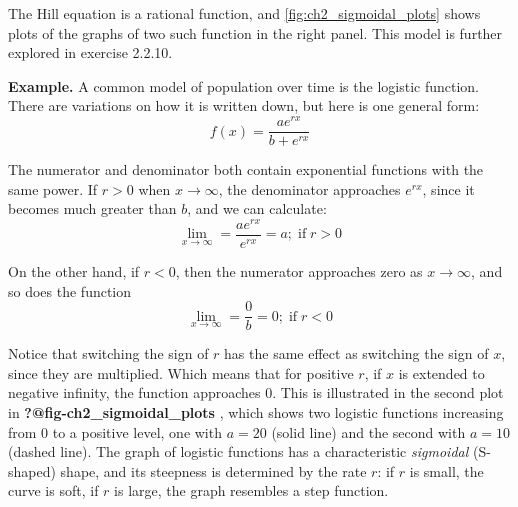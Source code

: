 \documentclass[
  letterpaper,
  DIV=11,
  numbers=noendperiod]{scrreprt}
\begin{document}
The Hill equation is a rational function, and
\ref{fig:ch2_sigmoidal_plots} shows plots of the graphs of two such
function in the right panel. This model is further explored in exercise
2.2.10.

\textbf{Example.} A common model of population over time is the
 logistic function. There are variations on how
it is written down, but here is one general form: \begin{equation}
 f(x) = \frac{a e^{rx} }{b+e^{rx}}
\label{eq:logistic_funk} 
\end{equation}

The numerator and denominator both contain exponential functions with
the same power. If \(r>0\) when \(x \to \infty\), the denominator
approaches \(e^{rx}\), since it becomes much greater than \(b\), and we
can calculate:
\[  \lim_{x \to \infty}  =  \frac{a e^{rx} }{e^{rx}} = a; \; \mathrm{if} \; r>0 \]

On the other hand, if \(r<0\), then the numerator approaches zero as
\(x \to \infty\), and so does the function
\[  \lim_{x \to \infty}  =  \frac{0}{b} = 0; \; \mathrm{if} \; r<0 \]

Notice that switching the sign of \(r\) has the same effect as switching
the sign of \(x\), since they are multiplied. Which means that for
positive \(r\), if \(x\) is extended to negative infinity, the function
approaches 0. This is illustrated in the second plot in
\textbf{?@fig-ch2\_sigmoidal\_plots} , which shows two logistic
functions increasing from 0 to a positive level, one with \(a=20\)
(solid line) and the second with \(a=10\) (dashed line). The graph of
logistic functions has a characteristic \emph{sigmoidal} (S-shaped)
shape, and its steepness is determined by the rate \(r\): if \(r\) is
small, the curve is soft, if \(r\) is large, the graph resembles a step
function.
\end{document}

